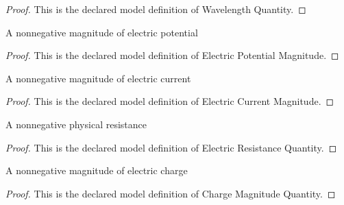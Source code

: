 \begin{proof}
  This is the declared model definition of Wavelength Quantity.
\end{proof}
\begin{definition}
  \label{def:physics:phyx-mini-0612:phyxminiproblems-problemphyxmini0612-electricpotentialmagnitude}
  A nonnegative magnitude of electric potential
\end{definition}
\begin{proof}
  This is the declared model definition of Electric Potential Magnitude.
\end{proof}
\begin{definition}
  \label{def:physics:phyx-mini-0612:phyxminiproblems-problemphyxmini0612-electriccurrentmagnitude}
  A nonnegative magnitude of electric current
\end{definition}
\begin{proof}
  This is the declared model definition of Electric Current Magnitude.
\end{proof}
\begin{definition}
  \label{def:physics:phyx-mini-0612:phyxminiproblems-problemphyxmini0612-electricresistancequantity}
  A nonnegative physical resistance
\end{definition}
\begin{proof}
  This is the declared model definition of Electric Resistance Quantity.
\end{proof}
\begin{definition}
  \label{def:physics:phyx-mini-0612:phyxminiproblems-problemphyxmini0612-chargemagnitudequantity}
  A nonnegative magnitude of electric charge
\end{definition}
\begin{proof}
  This is the declared model definition of Charge Magnitude Quantity.
\end{proof}
